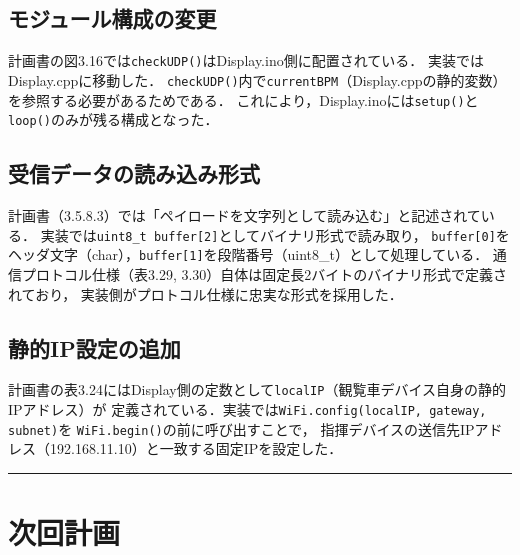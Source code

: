 \documentclass[uplatex,dvipdfmx,a4paper,11pt]{jsarticle}
\newcommand{\sectionrule}{\par\medskip\noindent\rule{\linewidth}{0.6pt}\par\medskip}
\begin{document}
\subsection{モジュール構成の変更}

計画書の図3.16では\texttt{checkUDP()}はDisplay.ino側に配置されている．
実装ではDisplay.cppに移動した．
\texttt{checkUDP()}内で\texttt{currentBPM}（Display.cppの静的変数）を参照する必要があるためである．
これにより，Display.inoには\texttt{setup()}と\texttt{loop()}のみが残る構成となった．

\subsection{受信データの読み込み形式}

計画書（3.5.8.3）では「ペイロードを文字列として読み込む」と記述されている．
実装では\texttt{uint8\_t buffer[2]}としてバイナリ形式で読み取り，
\texttt{buffer[0]}をヘッダ文字（char），\texttt{buffer[1]}を段階番号（uint8\_t）として処理している．
通信プロトコル仕様（表3.29, 3.30）自体は固定長2バイトのバイナリ形式で定義されており，
実装側がプロトコル仕様に忠実な形式を採用した．

\subsection{静的IP設定の追加}

計画書の表3.24にはDisplay側の定数として\texttt{localIP}（観覧車デバイス自身の静的IPアドレス）が
定義されている．実装では\texttt{WiFi.config(localIP, gateway, subnet)}を
\texttt{WiFi.begin()}の前に呼び出すことで，
指揮デバイスの送信先IPアドレス（192.168.11.10）と一致する固定IPを設定した．

\sectionrule


\section{次回計画}
\end{document}
